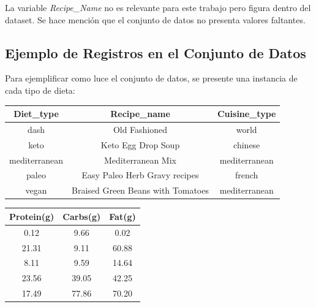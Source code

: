 \documentclass[12pt,a4paper]{article}
\begin{document}
        La variable \emph{Recipe\_Name} no es relevante para este trabajo pero figura 
        dentro del dataset. Se hace mención que el conjunto de datos no presenta 
        valores faltantes.

    \subsection{Ejemplo de Registros en el Conjunto de Datos}

        Para ejemplificar como luce el conjunto de datos, se presente 
        una instancia de cada tipo de dieta:

        \begin{center}

            \begin{tabular}{| c | c | c |}
                \toprule
                \textbf{Diet\_type} & \textbf{Recipe\_name} & \textbf{Cuisine\_type} \\
                \midrule
                dash          & Old Fashioned                     & world \\
                keto          & Keto Egg Drop Soup                & chinese \\
                mediterranean & Mediterranean Mix                 & mediterranean \\
                paleo         & Easy Paleo Herb Gravy recipes     & french \\
                vegan         & Braised Green Beans with Tomatoes & mediterranean \\
                \bottomrule
            \end{tabular}

        \end{center}

        \begin{center}

            \begin{tabular}{| c | c | c |}
                \toprule
                \textbf{Protein(g)} & \textbf{Carbs(g)} & \textbf{Fat(g)} \\
                \midrule
                 0.12 &  9.66 &  0.02 \\
                21.31 &  9.11 & 60.88 \\
                 8.11 &  9.59 & 14.64 \\
                23.56 & 39.05 & 42.25 \\
                17.49 & 77.86 & 70.20 \\
                \bottomrule
            \end{tabular}

        \end{center}
\end{document}
